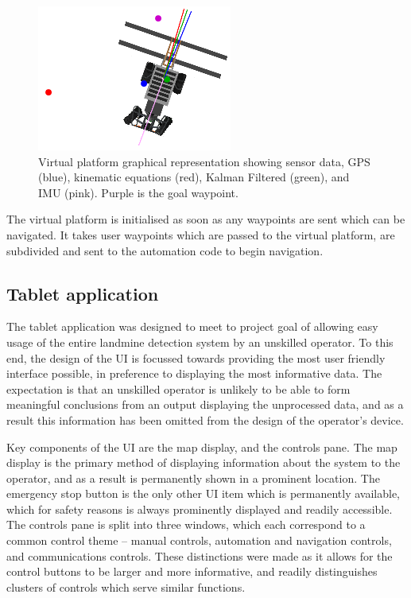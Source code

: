 \documentclass[main.tex]{subfiles}
\begin{document}
\begin{figure}[ht]
\includegraphics[]{4-DetailedDesign/dataVisibleVirtualPlatform.PNG}
\centering
\caption[Virtual platform graphical representation]{Virtual platform graphical representation showing sensor data, GPS (blue), kinematic equations (red), Kalman Filtered (green), and IMU (pink). Purple is the goal waypoint.} 
\end{figure}
The virtual platform is initialised as soon as any waypoints are sent which can be navigated. It takes user waypoints which are passed to the virtual platform, are subdivided and sent to the automation code to begin navigation.

\subsection{Tablet application}
The tablet application was designed to meet to project goal of allowing easy usage of the entire landmine detection system by an unskilled operator. To this end, the design of the UI is focussed towards providing the most user friendly interface possible, in preference to displaying the most informative data. The expectation is that an unskilled operator is unlikely to be able to form meaningful conclusions from an output displaying the unprocessed data, and as a result this information has been omitted from the design of the operator’s device. 

Key components of the UI are the map display, and the controls pane. The map display is the primary method of displaying information about the system to the operator, and as a result is permanently shown in a prominent location. The emergency stop button is the only other UI item which is permanently available, which for safety reasons is always prominently displayed and readily accessible. The controls pane is split into three windows, which each correspond to a common control theme – manual controls, automation and navigation controls, and communications controls. These distinctions were made as it allows for the control buttons to be larger and more informative, and readily distinguishes clusters of controls which serve similar functions. 
\end{document}
